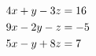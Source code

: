 \begin{equation} \label{eq:exMultiOneN}
	\begin{aligned}
		4x + y - 3z &= 16 \\
		9x - 2y - z &= -5 \\
		5x - y + 8z &= 7
	\end{aligned}
\end{equation}
